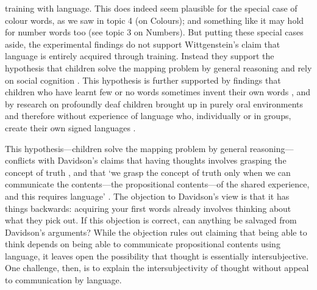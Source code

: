 \documentclass[12pt,\papersize]{extarticle}
\begin{document}
training with language.
This does indeed seem plausible for the special case of colour words, as we saw in topic 4 (on Colours); 
and something like it may hold for number words too (see topic 3 on Numbers).  
But putting these special cases aside, the experimental findings do not support Wittgenstein's claim that language is entirely acquired through training.
Instead they support the hypothesis that children solve the mapping problem by general reasoning and rely on social cognition
\citep{Baldwin:1995xl,Bloom:2000qz,Sabbagh:2001sp}. 
This hypothesis is further supported by findings that children who have learnt few or no words sometimes invent their own words \citep{Clark:1993bv}, 
and by
research on profoundly deaf children brought up in purely oral environments and therefore without experience of language who, individually or in groups, create their own signed languages \citep{Kegl:1999es,Senghas:2001zm,Goldin-Meadow:2003pj}. 

This hypothesis---children solve the mapping problem by general reasoning---conflicts with Davidson's claims that having thoughts involves grasping the concept of truth \citep[p.\ 189]{Davidson:2001sm}, 
and that `we grasp the concept of truth only when we can communicate the contents—the propositional contents—of the shared experience, and this requires language' \citep[p.\ 27]{Davidson:1997wj}.
%
The objection to Davidson's view is that  it has things backwards: acquiring your first words already involves thinking about what they pick out. 
If this objection is correct, can anything be salvaged from Davidson's arguments? 
While the objection rules out claiming that being able to think depends on being able to communicate propositional contents using language, it leaves open the possibility that thought is essentially intersubjective.
One challenge, then, is to explain the intersubjectivity of thought without appeal to communication by language.
\end{document}
